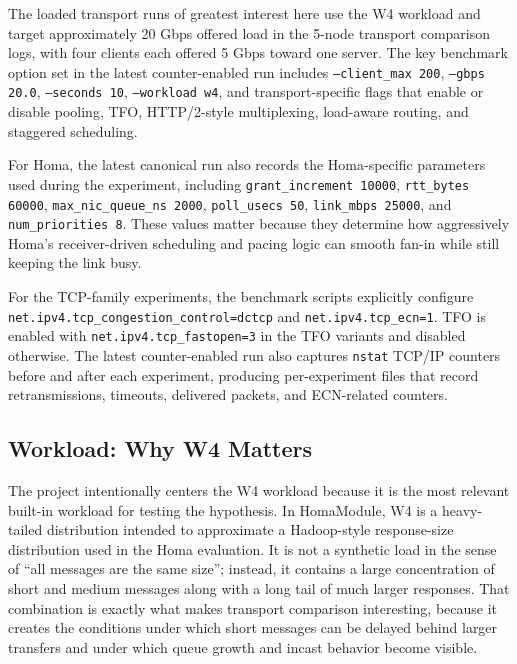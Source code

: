\documentclass[11pt]{article}
\begin{document}
The loaded transport runs of greatest interest here use the W4 workload and target approximately 20 Gbps offered load in the 5-node transport comparison logs, with four clients each offered 5 Gbps toward one server. The key benchmark option set in the latest counter-enabled run includes \texttt{--client\_max 200}, \texttt{--gbps 20.0}, \texttt{--seconds 10}, \texttt{--workload w4}, and transport-specific flags that enable or disable pooling, TFO, HTTP/2-style multiplexing, load-aware routing, and staggered scheduling.

For Homa, the latest canonical run also records the Homa-specific parameters used during the experiment, including \texttt{grant\_increment 10000}, \texttt{rtt\_bytes 60000}, \texttt{max\_nic\_queue\_ns 2000}, \texttt{poll\_usecs 50}, \texttt{link\_mbps 25000}, and \texttt{num\_priorities 8}. These values matter because they determine how aggressively Homa's receiver-driven scheduling and pacing logic can smooth fan-in while still keeping the link busy.

For the TCP-family experiments, the benchmark scripts explicitly configure \texttt{net.ipv4.tcp\_congestion\_control=dctcp} and \texttt{net.ipv4.tcp\_ecn=1}. TFO is enabled with \texttt{net.ipv4.tcp\_fastopen=3} in the TFO variants and disabled otherwise. The latest counter-enabled run also captures \texttt{nstat} TCP/IP counters before and after each experiment, producing per-experiment files that record retransmissions, timeouts, delivered packets, and ECN-related counters.

\subsection{Workload: Why W4 Matters}

The project intentionally centers the W4 workload because it is the most relevant built-in workload for testing the hypothesis. In HomaModule, W4 is a heavy-tailed distribution intended to approximate a Hadoop-style response-size distribution used in the Homa evaluation. It is not a synthetic load in the sense of ``all messages are the same size''; instead, it contains a large concentration of short and medium messages along with a long tail of much larger responses. That combination is exactly what makes transport comparison interesting, because it creates the conditions under which short messages can be delayed behind larger transfers and under which queue growth and incast behavior become visible.
\end{document}
